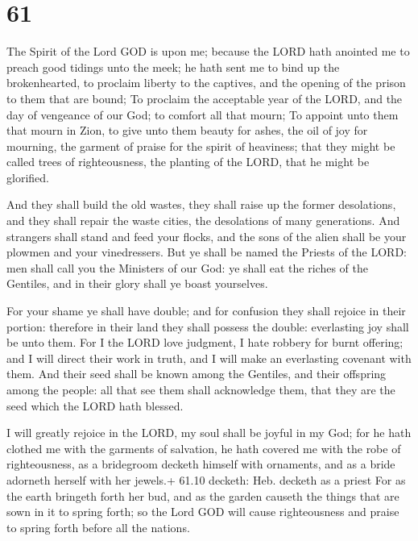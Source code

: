 \hypertarget{section-60}{%
\section{61}\label{section-60}}

 The Spirit of the Lord GOD is upon me; because the LORD
hath anointed me to preach good tidings unto the meek; he hath sent me
to bind up the brokenhearted, to proclaim liberty to the captives, and
the opening of the prison to them that are bound;  To
proclaim the acceptable year of the LORD, and the day of vengeance of
our God; to comfort all that mourn;  To appoint unto them
that mourn in Zion, to give unto them beauty for ashes, the oil of joy
for mourning, the garment of praise for the spirit of heaviness; that
they might be called trees of righteousness, the planting of the LORD,
that he might be glorified.

 And they shall build the old wastes, they shall raise up
the former desolations, and they shall repair the waste cities, the
desolations of many generations.  And strangers shall stand
and feed your flocks, and the sons of the alien shall be your plowmen
and your vinedressers.  But ye shall be named the Priests of
the LORD: men shall call you the Ministers of our God: ye shall eat the
riches of the Gentiles, and in their glory shall ye boast yourselves.

 For your shame ye shall have double; and for confusion
they shall rejoice in their portion: therefore in their land they shall
possess the double: everlasting joy shall be unto them.  For
I the LORD love judgment, I hate robbery for burnt offering; and I will
direct their work in truth, and I will make an everlasting covenant with
them.  And their seed shall be known among the Gentiles, and
their offspring among the people: all that see them shall acknowledge
them, that they are the seed which the LORD hath blessed.

 I will greatly rejoice in the LORD, my soul shall be
joyful in my God; for he hath clothed me with the garments of salvation,
he hath covered me with the robe of righteousness, as a bridegroom
decketh himself with ornaments, and as a bride adorneth herself with her
jewels.+ 61.10 decketh: Heb. decketh as a priest  For as
the earth bringeth forth her bud, and as the garden causeth the things
that are sown in it to spring forth; so the Lord GOD will cause
righteousness and praise to spring forth before all the nations.

